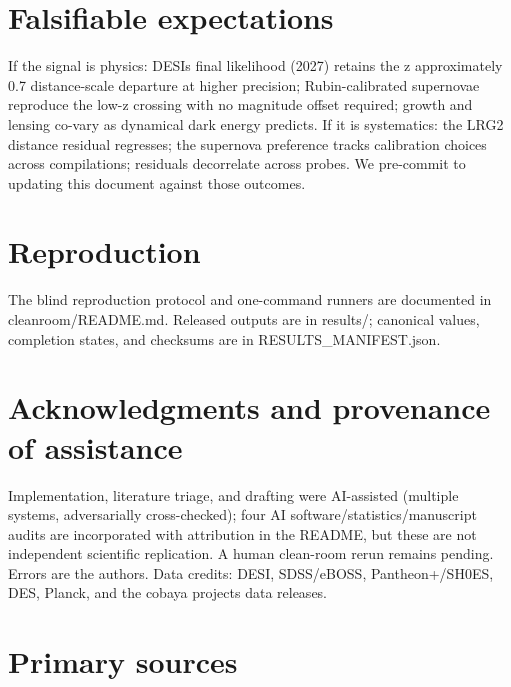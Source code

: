 \documentclass[aps,prd,preprint,superscriptaddress,nofootinbib]{revtex4-2}
\begin{document}
\section{Falsifiable expectations}\label{falsifiable-expectations}

If the signal is physics: DESI\textquotesingle s final likelihood (2027)
retains the z approximately 0.7 distance-scale departure at higher
precision; Rubin-calibrated supernovae reproduce the low-z crossing with
no magnitude offset required; growth and lensing co-vary as dynamical
dark energy predicts. If it is systematics: the LRG2 distance residual
regresses; the supernova preference tracks calibration choices across
compilations; residuals decorrelate across probes. We pre-commit to
updating this document against those outcomes.

\section{Reproduction}\label{reproduction-1}

The blind reproduction protocol and one-command runners are documented
in cleanroom/README.md. Released outputs are in results/; canonical
values, completion states, and checksums are in RESULTS\_MANIFEST.json.

\section{Acknowledgments and provenance of
assistance}\label{acknowledgments-and-provenance-of-assistance}

Implementation, literature triage, and drafting were AI-assisted
(multiple systems, adversarially cross-checked); four AI
software/statistics/manuscript audits are incorporated with attribution
in the README, but these are not independent scientific replication. A
human clean-room rerun remains pending. Errors are the
author\textquotesingle s. Data credits: DESI, SDSS/eBOSS,
Pantheon+/SH0ES, DES, Planck, and the cobaya project\textquotesingle s
data releases.

\section{Primary sources}\label{primary-sources}
\end{document}
